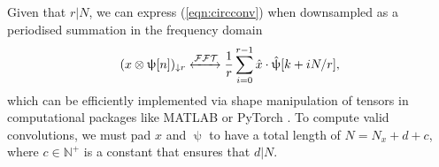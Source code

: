 Given that $r|N$, we can express (\ref{eqn:circconv}) when downsampled as a periodised summation \citep{waveletsandsubbandcoding} in the frequency domain
\begin{equation}
    (x \otimes \uppsi [n])_{\downarrow r} \xleftrightarrow{\mathcal{FFT}}  \frac{1}{r} \sum_{i=0}^{r-1} \hat{x} \cdot \hat{\uppsi} [k + iN/r], %
\end{equation}
which can be efficiently implemented via shape manipulation of tensors in computational packages like MATLAB or PyTorch \citep{pytorch}. To compute valid convolutions, we must pad $x$ and $\uppsi$ to have a total length of $N = N_x + d + c$, where $c \in \mathbb{N}^+$ is a constant that ensures that $d | N$. 





